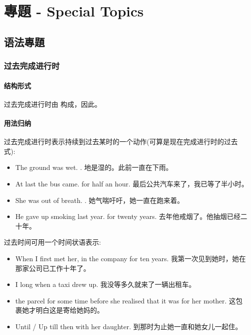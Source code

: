 \chapter{專題 - Special Topics}
\section{语法專題}
\subsection{过去完成进行时}
\subsubsection{结构形式}
过去完成进行时由	构成，因此。

\subsubsection{用法归纳}
过去完成进行时表示持续到过去某时的一个动作(可算是现在完成进行时的过去式):
\begin{itemize}
  \itemsep0em
  \item The ground was wet. . 地是湿的。此前一直在下雨。
  \item At last the bus came.  for half an hour. 最后公共汽车来了，我已等了半小时。
  \item She was out of breath. . 她气喘吁吁，她一直在跑来着。
  \item He gave up smoking last year.  for twenty years. 去年他戒烟了。他抽烟已经二十年。
\end{itemize}

过去时间可用一个时间状语表示:
\begin{itemize}
  \itemsep0em
  \item When I first met her,  in the company for ten years. 我第一次见到她时，她在那家公司已工作十年了。
  \item I  long when a taxi drew up. 我没等多久就来了一辆出租车。
  \item {} the parcel for some time before she realised that it was for her mother. 这包裹她才明白这是寄给她妈的。
  \item Until / Up till then  with her daughter. 到那时为止她一直和她女儿一起住。
\end{itemize}

